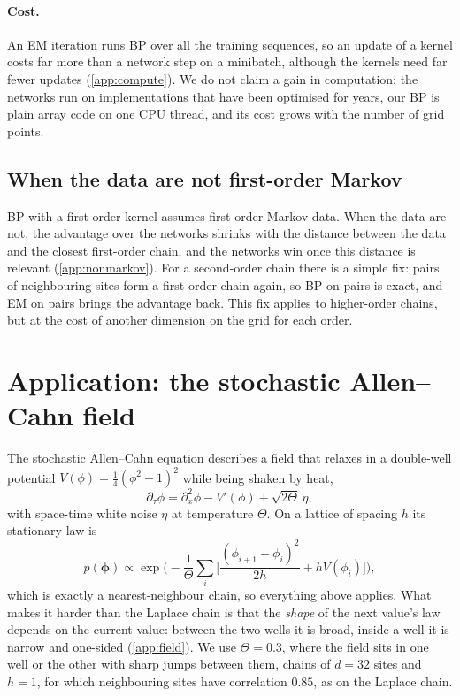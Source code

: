 \documentclass{article}
\begin{document}
\paragraph{Cost.}
\label{sec:steps}
An EM iteration runs BP over all the training sequences, so an update of a kernel costs far more than a network step on
a minibatch, although the kernels need far fewer updates (\cref{app:compute}). We do not claim a gain in computation: the
networks run on implementations that have been optimised for years, our BP is plain array code on one CPU thread, and its
cost grows with the number of grid points.

\subsection{When the data are not first-order Markov}
\label{sec:nonmarkov}

BP with a first-order kernel assumes first-order Markov data. When the data are not, the advantage over the networks
shrinks with the distance between the data and the closest first-order chain, and the networks win once this distance is relevant (\cref{app:nonmarkov}). For a second-order chain there is a simple fix: pairs of
neighbouring sites form a first-order chain again, so BP on pairs is exact, and EM on pairs brings the advantage back. This fix applies to higher-order chains, but at the cost of another dimension on the grid for each order.
\section{Application: the stochastic Allen--Cahn field}
\label{sec:allen-cahn}

The stochastic Allen--Cahn equation \cite{allen1979microscopic,dapratozabczyk2014} describes a field that relaxes in a
double-well potential $V(\phi)=\tfrac14(\phi^2-1)^2$ while being shaken by heat,
\begin{equation}
  \partial_\tau\phi=\partial_x^2\phi-V'(\phi)+\sqrt{2\Theta}\,\eta,
\end{equation}
with space-time white noise $\eta$ at temperature $\Theta$. On a lattice of spacing $h$ its stationary law is
\begin{equation}
  p(\boldsymbol\phi)\propto\exp\Big(-\frac1\Theta\sum_i\Big[\frac{(\phi_{i+1}-\phi_i)^2}{2h}+hV(\phi_i)\Big]\Big),
\end{equation}
which is exactly a nearest-neighbour chain, so everything above applies. What makes it harder than the Laplace chain is
that the \emph{shape} of the next value's law depends on the current value: between the two wells it is broad, inside a
well it is narrow and one-sided (\cref{app:field}). We use $\Theta=0.3$, where the field sits in one well or the other
with sharp jumps between them, chains of $d=32$ sites and $h=1$, for which neighbouring sites have correlation $0.85$, as
on the Laplace chain.
\end{document}
